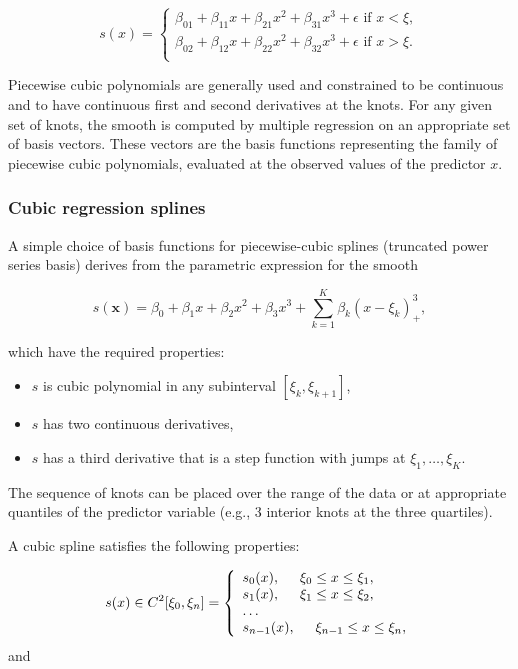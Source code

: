 \documentclass[]{book}
\begin{document}
\[
s(x)  = \left\{
    \begin{array}{ll}
        \beta_{01} + \beta_{11}x + \beta_{21}x^2 + \beta_{31}x^3 + \epsilon \text{ if } x < \xi, \\
        \beta_{02} + \beta_{12}x + \beta_{22}x^2 + \beta_{32}x^3 + \epsilon \text{ if } x > \xi.  \\
    \end{array}
\right.
\]

Piecewise cubic polynomials are generally used and constrained to be
continuous and to have continuous first and second derivatives at the
knots. For any given set of knots, the smooth is computed by multiple
regression on an appropriate set of basis vectors. These vectors are the
basis functions representing the family of piecewise cubic polynomials,
evaluated at the observed values of the predictor \(x\).

\hypertarget{cubic-regression-splines}{%
\subsubsection*{Cubic regression splines}\label{cubic-regression-splines}}

A simple choice of basis functions for piecewise-cubic splines
(truncated power series basis) derives from the parametric expression
for the smooth

\[s(\boldsymbol{x}) = \beta_0 + \beta_1x + \beta_2x^2 + \beta_3x^3 + \sum_{k=1}^{\mathit{K}}\beta_k(x - \xi_k)_+^3, 
\label{eq:cubic}\]

which have the required properties:

\begin{itemize}
\item
  \(s\) is cubic polynomial in any subinterval \([\xi_k,\xi_{k+1}]\),
\item
  \(s\) has two continuous derivatives,
\item
  \(s\) has a third derivative that is a step function with jumps at
  \(\xi_1,\dots,\xi_{\mathit{K}}\).
\end{itemize}

The sequence of knots can be placed over the range of the data or at
appropriate quantiles of the predictor variable (e.g., 3 interior knots
at the three quartiles).

A cubic spline satisfies the following properties:

\[s(x) \in C^2[\xi_0,\xi_n] = \left\{
    \begin{array}{ll}
        s_{0}(x), \hspace{.5cm} \xi_0 \leq x \leq \xi_1, \\
        s_{1}(x), \hspace{.5cm} \xi_1 \leq x \leq \xi_2, \\
        \dots\\
        s_{n-1}(x), \hspace{.5cm} \xi_{n-1} \leq x \leq \xi_n, \\
    \end{array}
\right.\] and
\end{document}
